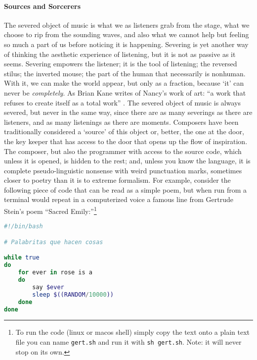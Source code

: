 \paragraph{Sources and Sorcerers}
The severed object of music is what we as listeners grab from the stage, what we choose to rip from the sounding waves, and also what we cannot help but feeling so much a part of us before noticing it is happening. Severing is yet another way of thinking the aesthetic experience of listening, but it is not as passive as it seems. Severing empowers the listener; it is the tool of listening; the reversed stilus; the inverted mouse; the part of the human that necessarily is nonhuman. With it, we can make the world appear, but only as a fraction, because `it' can never be \textit{completely}. As Brian Kane writes of Nancy's work of art: ``a work that refuses to create itself as a total work'' \parencite[29]{Gra15:The}. The severed object of music is always severed, but never in the same way, since there are as many severings as there are listeners, and as many listenings as there are moments. Composers have been traditionally considered a `source' of this object or, better, the one at the door, the key keeper that has access to the door that opens up the flow of inspiration. The composer, but also the programmer with access to the source code, which unless it is opened, is hidden to the rest; and, unless you know the language, it is complete pseudo-linguistic nonsense with weird punctuation marks, sometimes closer to poetry than it is to extreme formalism. For example, consider the following piece of code that can be read as a simple poem, but when run from a terminal would repeat in a computerized voice a famous line from Gertrude Stein's poem ``Sacred Emily:''\footnote{To run the code (linux or macos shell) simply copy the text onto a plain text file you can name \texttt{gert.sh} and run it with \texttt{sh gert.sh}. Note: it will never stop on its own.}

\begin{flushleft}
\small
\begin{lstlisting}[caption={Little words that do things.},captionpos=b,language=bash,mathescape=false]
#!/bin/bash

# Palabritas que hacen cosas

while true
do
	for ever in rose is a
	do 
		say $ever
		sleep $((RANDOM/10000))
	done
done

\end{lstlisting}
\end{flushleft}

